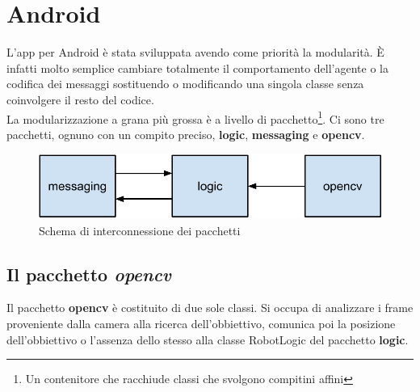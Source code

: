 \section {Android}
L'app per Android è stata sviluppata avendo come priorità la modularità. È 
infatti molto semplice cambiare totalmente il comportamento dell'agente o la 
codifica dei messaggi sostituendo o modificando una singola classe senza 
coinvolgere il resto del codice.\\
La modularizzazione a grana più grossa è a livello di pacchetto\footnote{Un contenitore 
che racchiude classi che svolgono compitini affini}. Ci sono tre pacchetti,
ognuno con un compito preciso, \textbf{logic}, \textbf{messaging} e \textbf{opencv}.
\begin{figure}[H] \center
\includegraphics[width=\textwidth]{immagini/interconnessione_pacchetti.pdf}
\caption{Schema di interconnessione dei pacchetti} 
\end{figure}

\subsection {Il pacchetto \textit{opencv}}
Il pacchetto \textbf{opencv} è costituito di due sole classi. Si occupa di analizzare 
i frame proveniente dalla camera alla ricerca dell'obbiettivo, comunica poi la posizione 
dell'obbiettivo o l'assenza dello stesso alla classe RobotLogic del pacchetto 
\textbf{logic}.
